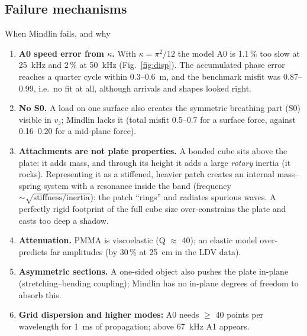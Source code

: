 \documentclass[11pt,a4paper]{article}
\begin{document}
\subsection{Failure mechanisms}
\begin{failbox}{When Mindlin fails, and why}
\begin{enumerate}
  \item \textbf{A0 speed error from $\kappa$.} With $\kappa = \pi^2/12$ the model A0 is 1.1\,\% too slow at 25~kHz
        and 2\,\% at 50~kHz (Fig.~\ref{fig:disp}). The accumulated phase error reaches a quarter cycle within
        0.3--0.6~m, and the benchmark misfit was 0.87--0.99, i.e.\ no fit at all, although arrivals and shapes looked
        right.
  \item \textbf{No S0.} A load on one surface also creates the symmetric breathing part (S0) visible in $v_z$; Mindlin
        lacks it (total misfit 0.5--0.7 for a surface force, against 0.16--0.20 for a mid-plane force).
  \item \textbf{Attachments are not plate properties.} A bonded cube sits above the plate: it adds mass, and through
        its height it adds a large \emph{rotary} inertia (it rocks). Representing it as a stiffened, heavier patch
        creates an internal mass--spring system with a resonance inside the band (frequency
        $\sim\sqrt{\text{stiffness}/\text{inertia}}$): the patch ``rings'' and radiates spurious waves. A perfectly
        rigid footprint of the full cube size over-constrains the plate and casts too deep a shadow.
  \item \textbf{Attenuation.} PMMA is viscoelastic (Q $\approx$ 40); an elastic model over-predicts far amplitudes
        (by 30\,\% at 25~cm in the LDV data).
  \item \textbf{Asymmetric sections.} A one-sided object also pushes the plate in-plane (stretching--bending coupling);
        Mindlin has no in-plane degrees of freedom to absorb this.
  \item \textbf{Grid dispersion and higher modes:} A0 needs $\geq$ 40 points per wavelength for 1~ms of propagation;
        above 67~kHz A1 appears.
\end{enumerate}
\end{failbox}
\end{document}
